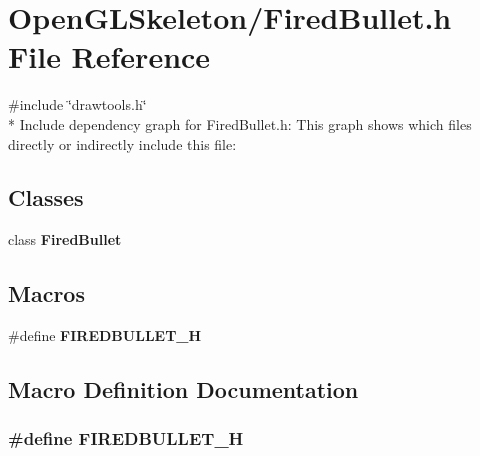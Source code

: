 \section{Open\+G\+L\+Skeleton/\+Fired\+Bullet.h File Reference}
\label{_fired_bullet_8h}
{\ttfamily \#include \char`\"{}drawtools.\+h\char`\"{}}\\*
Include dependency graph for Fired\+Bullet.\+h\+:
This graph shows which files directly or indirectly include this file\+:
\subsection*{Classes}
\begin{DoxyCompactItemize}
\item 
class {\bf Fired\+Bullet}
\end{DoxyCompactItemize}
\subsection*{Macros}
\begin{DoxyCompactItemize}
\item 
\#define {\bf F\+I\+R\+E\+D\+B\+U\+L\+L\+E\+T\+\_\+H}
\end{DoxyCompactItemize}


\subsection{Macro Definition Documentation}
\subsubsection[{F\+I\+R\+E\+D\+B\+U\+L\+L\+E\+T\+\_\+H}]{\setlength{\rightskip}{0pt plus 5cm}\#define F\+I\+R\+E\+D\+B\+U\+L\+L\+E\+T\+\_\+H}\label{_fired_bullet_8h_a16f4b748457c5a2f2d2319a585421174}
